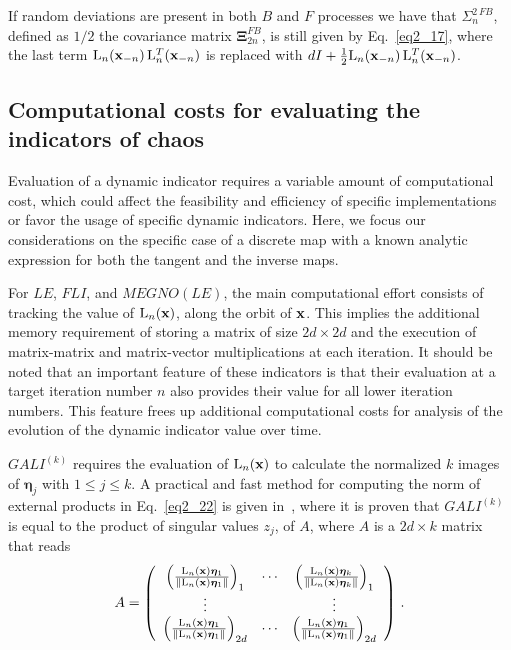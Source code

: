 \begin{chapterappendices}{}
If random deviations are present in both $B$ and $F$ processes we
have that  $\Sigma^{2\,FB}_{n} $,  defined  as $1/2$ the covariance matrix $\boldsymbol{\Xi}^{FB}_{2n}$,
is still given by Eq.~\eqref{eq2_17}, where the last term $\mathrm{L}_{n}(\vb{x}_{-n})\, \mathrm{L}_{n}^T(\vb{x}_{-n})$
is replaced with $dI+\frac{1}{ 2}\mathrm{L}_{n}(\vb{x}_{-n})\, \mathrm{L}_{n}^T(\vb{x}_{-n})$.
%
\subsection{Computational costs for evaluating the indicators of chaos}
%
Evaluation of a dynamic indicator requires a variable amount of computational cost, which could affect the feasibility and efficiency of specific implementations or favor the usage of specific dynamic indicators. Here, we focus our considerations on the specific case of a discrete map with a known analytic expression for both the tangent and the inverse maps.

For $LE$, $FLI$, and $MEGNO(LE)$, the main computational effort consists of tracking the value of $\mathrm{L}_n(\vb{x})$, along the orbit of $\vb{x}$. This implies the additional memory requirement of storing a matrix of size $2d\times2d$ and the execution of matrix-matrix and matrix-vector multiplications at each iteration. It should be noted that an important feature of these indicators is that their evaluation at a target iteration number $n$ also provides their value for all lower iteration numbers. This feature frees up additional computational costs for analysis of the evolution of the dynamic indicator value over time.

$GALI^{(k)}$ requires the evaluation of $\mathrm{L}_n(\vb{x})$ to calculate the normalized $k$ images of $\boldsymbol{\eta}_j$ with $1\leq j \leq k$. A practical and fast method for computing the norm of external products in Eq.~\eqref{eq2_22} is given in~\cite{Skokos2008}, where it is proven that $GALI^{(k)}$ is equal to the product of singular values $z_j$, of $A$, where $A$ is a $2d\times k$ matrix that reads
\begin{equation}
    A = \left(\begin{array}{ccc}
        \left(\frac{\mathrm{L}_n(\vb{x}) \boldsymbol{\eta}_1}{ \Vert \mathrm{L}_n(\vb{x}) \boldsymbol{\eta}_1\Vert}\right)_1 & \cdots & \left(\frac{\mathrm{L}_n(\vb{x}) \boldsymbol{\eta}_k}{ \Vert \mathrm{L}_n(\vb{x}) \boldsymbol{\eta}_k\Vert}\right)_1 \\
        \vdots &  & \vdots \\
        \left(\frac{\mathrm{L}_n(\vb{x}) \boldsymbol{\eta}_1}{ \Vert \mathrm{L}_n(\vb{x}) \boldsymbol{\eta}_1\Vert}\right)_{2d} & \cdots & \left(\frac{\mathrm{L}_n(\vb{x}) \boldsymbol{\eta}_1}{ \Vert \mathrm{L}_n(\vb{x}) \boldsymbol{\eta}_1\Vert}\right)_{2d}
    \end{array}\right)\,.
\end{equation}


\end{chapterappendices}
